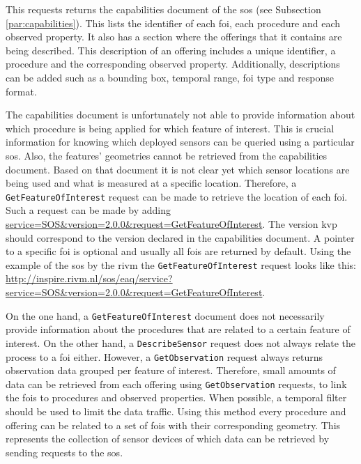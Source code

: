 This requests returns the capabilities document of the \ac{sos} (see Subsection \ref{par:capabilities}). This lists the identifier of each \ac{foi}, each procedure and each observed property. It also has a section where the offerings that it contains are being described. This description of an offering includes a unique identifier, a procedure and the corresponding observed property. Additionally, descriptions can be added such as a bounding box, temporal range, \ac{foi} type and response format.  

\begin{sloppypar}
	The capabilities document is unfortunately not able to provide information about which procedure is being applied for which feature of interest. This is crucial information for knowing which deployed sensors can be queried using a particular \ac{sos}. Also, the features' geometries cannot be retrieved from the capabilities document. Based on that document it is not clear yet which sensor locations are being used and what is measured at a specific location. Therefore, a \texttt{GetFeatureOfInterest} request can be made to retrieve the location of each \ac{foi}. Such a request can be made by adding \url{service=SOS&version=2.0.0&request=GetFeatureOfInterest}. The version \ac{kvp} should correspond to the version declared in the capabilities document. A pointer to a specific \ac{foi} is optional and usually all \acp{foi} are returned by default. Using the example of the \ac{sos} by the \ac{rivm} the \texttt{GetFeatureOfInterest} request looks like this: \url{http://inspire.rivm.nl/sos/eaq/service?service=SOS&version=2.0.0&request=GetFeatureOfInterest}.
\end{sloppypar}

On the one hand, a \texttt{GetFeatureOfInterest} document does not necessarily provide information about the procedures that are related to a certain feature of interest. On the other hand, a \texttt{DescribeSensor} request does not always relate the process to a \ac{foi} either. However, a \texttt{GetObservation} request always returns observation data grouped per feature of interest. Therefore, small amounts of data can be retrieved from each offering using \texttt{GetObservation} requests, to link the \acp{foi} to procedures and observed properties. When possible, a temporal filter should be used to limit the data traffic. Using this method every procedure and offering can be related to a set of \acp{foi} with their corresponding geometry. This represents the collection of sensor devices of which data can be retrieved by sending requests to the \ac{sos}. 


